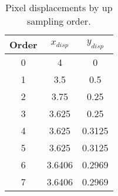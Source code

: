 \begin{table}[H]
\begin{center}
\begin{tabular}{|ccc|}
	\hline
	Order & $x_{disp}$ & $y_{disp}$\\
	\hline
	0 & 4 & 0\\
	1 & 3.5 & 0.5\\
	2 & 3.75 & 0.25\\
	3 & 3.625 & 0.25\\
	4 & 3.625 & 0.3125\\
	5 & 3.625 & 0.3125\\
	6 & 3.6406 & 0.2969\\
	7 & 3.6406 & 0.2969\\
	\hline
\end{tabular}
\caption{Pixel displacements by up sampling order.}
\label{table:piv_upsampling_displacement}
\end{center}
\end{table}
